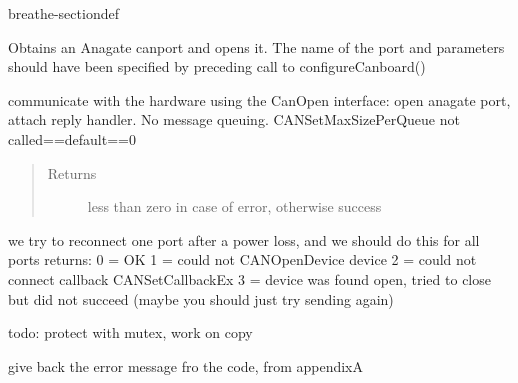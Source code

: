 \documentclass[a4paper,10pt,english]{sphinxmanual}
\begin{document}
\begin{fulllineitems}
\begin{sphinxuseclass}{breathe-sectiondef}
\begin{fulllineitems}
\sphinxAtStartPar
Obtains an Anagate canport and opens it. The name of the port and parameters should have been specified by preceding call to configureCanboard()

\sphinxAtStartPar
communicate with the hardware using the CanOpen interface: open anagate port, attach reply handler. No message queuing. CANSetMaxSizePerQueue not called==default==0

\begin{quote}\begin{description}
\item[{Returns}] \leavevmode
\sphinxAtStartPar
less than zero in case of error, otherwise success

\end{description}\end{quote}

\end{fulllineitems}



\begin{fulllineitems}
%
\pysigstartmultiline
{}%
\pysigstopmultiline
\sphinxAtStartPar
we try to reconnect one port after a power loss, and we should do this for all ports returns: 0 = OK \sphinxhyphen{}1 = could not CANOpenDevice device \sphinxhyphen{}2 = could not connect callback CANSetCallbackEx \sphinxhyphen{}3 = device was found open, tried to close but did not succeed (maybe you should just try sending again) 

\end{fulllineitems}



\begin{fulllineitems}
%
\pysigstartmultiline
{}%
\pysigstopmultiline
\sphinxAtStartPar
todo: protect with mutex, work on copy 

\end{fulllineitems}



\begin{fulllineitems}
%
\pysigstartmultiline
{}%
\pysigstopmultiline
\sphinxAtStartPar
give back the error message fro the code, from appendixA 


\end{fulllineitems}
\end{sphinxuseclass}
\end{fulllineitems}
\end{document}

